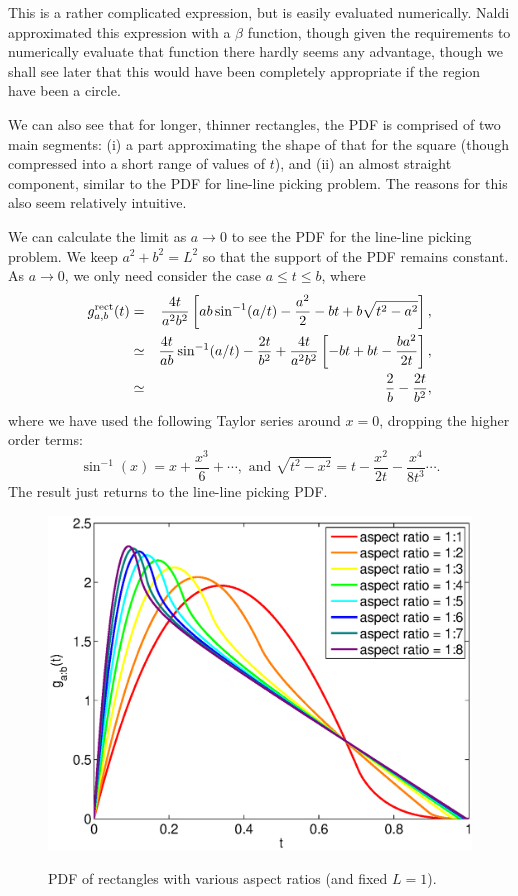 This is a rather complicated expression, but is easily evaluated
numerically.  Naldi \cite{m.naldi05:_connec_of_waxman_graph}
approximated this expression with a $\beta$ function, though given the
requirements to numerically evaluate that function there hardly seems
any advantage, though we shall see later that this would have been
completely appropriate if the region have been a circle.

We can also see that for longer, thinner rectangles, the PDF is
comprised of two main segments: (i) a part approximating the shape of
that for the square (though compressed into a short range of values of
$t$), and (ii) an almost straight component, similar to the PDF for
line-line picking problem. The reasons for this also seem relatively
intuitive. 

We can calculate the limit as $a \rightarrow 0$ to see the PDF for the
line-line picking problem.  We keep $a^2 + b^2 = L^2$ so that the
support of the PDF remains constant.  As $a \rightarrow 0$, we only
need consider the case $a \leq t \leq b$, where
\begin{eqnarray}
    g^{\rm rect}_{a,b}(t)
        & = & \frac{4 t}{a^2 b^2} 
                  \left[ a b \sin^{-1} (a/t) - \frac{a^2}{2} - b t + b\sqrt{t^2 - a^2} \right] , \nonumber \\
        & \simeq & \frac{4t }{a b} \sin^{-1} (a/t)
                   - \frac{2 t}{b^2}
                    + \frac{4 t}{a^2 b^2} \left[ -b t + b t - \frac{b a^2}{2 t} \right] , \nonumber \\
        & \simeq & \frac{2}{b}
                   - \frac{2 t}{b^2}, 
\end{eqnarray}
where we have used the following Taylor series around $x=0$, dropping
the higher order terms:
\[ \sin^{-1}(x) = x + \frac{x^3}{6} + \cdots, 
   \mbox{ and }
   \sqrt{t^2 - x^2} = t - \frac{x^2}{2t} - \frac{x^4}{8 t^3} \cdots .
\]
The result just returns to the line-line picking PDF.

\begin{figure}[htbp]
  \begin{center}
    \includegraphics[width=0.4\columnwidth]
          {../Matlab/Plots/LinePicking_plot_rect.eps}
    \label{fig:rect_pdf_var}
    \caption{PDF of rectangles with various aspect
              ratios (and fixed $L=1$).}
  \end{center} 
\vspace{-4mm}
\end{figure}

